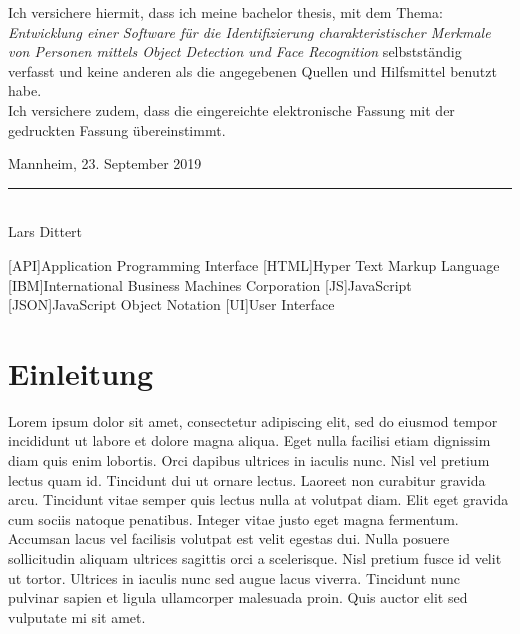 \documentclass[12pt,ngerman,a4paper,oneside,,tablecaptionabove]{scrbook}
\begin{document}
Ich versichere hiermit, dass ich meine \MakeLowercase{Bachelor Thesis}, mit dem Thema: \textit{Entwicklung einer Software für die Identifizierung charakteristischer
Merkmale von Personen mittels Object Detection und Face Recognition} selbstst\"andig verfasst und keine anderen als die angegebenen Quellen und Hilfsmittel benutzt habe.\vspace{0.5em}\\
Ich versichere zudem, dass die eingereichte elektronische Fassung mit der gedruckten Fassung \"ubereinstimmt.

\vspace{3em}
Mannheim, 23. September 2019
\vspace{4em}

\rule{6cm}{0.4pt}\\
Lars Dittert
\newpage



\newpage
\pagestyle{plain}
\setcounter{page}{1}

{
\setcounter{tocdepth}{2}
\tableofcontents
}


	\cleardoublepage
	\lstlistoflistings
{}
\begin{acronym}
	[API]{Application Programming Interface}
	[HTML]{Hyper Text Markup Language}
	[IBM]{International Business Machines Corporation}
	[JS]{JavaScript}
	[JSON]{JavaScript Object Notation}
	[UI]{User Interface}
\end{acronym}

\newpage
\pagestyle{fancy}
\setcounter{page}{1}
\hypertarget{sec:Einleitung}{%
\chapter{Einleitung}\label{sec:Einleitung}}

Lorem ipsum dolor sit amet, consectetur adipiscing elit, sed do eiusmod
tempor incididunt ut labore et dolore magna aliqua. Eget nulla facilisi
etiam dignissim diam quis enim lobortis. Orci dapibus ultrices in
iaculis nunc. Nisl vel pretium lectus quam id. Tincidunt dui ut ornare
lectus. Laoreet non curabitur gravida arcu. Tincidunt vitae semper quis
lectus nulla at volutpat diam. Elit eget gravida cum sociis natoque
penatibus. Integer vitae justo eget magna fermentum. Accumsan lacus vel
facilisis volutpat est velit egestas dui. Nulla posuere sollicitudin
aliquam ultrices sagittis orci a scelerisque. Nisl pretium fusce id
velit ut tortor. Ultrices in iaculis nunc sed augue lacus viverra.
Tincidunt nunc pulvinar sapien et ligula ullamcorper malesuada proin.
Quis auctor elit sed vulputate mi sit amet.
\end{document}
